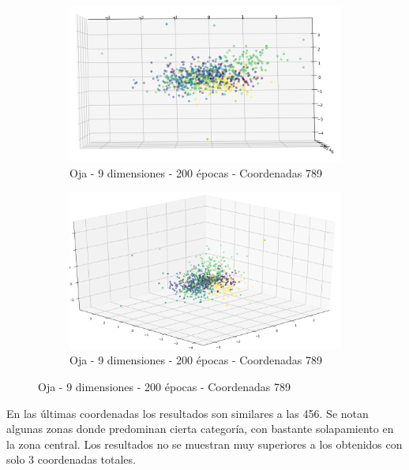 \begin{figure}[!htbp]
\centering
\begin{subfigure}{.5\textwidth}
  \centering
  \includegraphics[width=1\linewidth, scale=1]{../img/ej1/oja_corrida_200_9/oja_9salida_200ep_testing_dim789_3.png}
  \caption{Oja - 9 dimensiones - 200 épocas - Coordenadas 789}
  \label{fig:sub1}
\end{subfigure}%
\begin{subfigure}{.5\textwidth}
  \centering
  \includegraphics[width=1\linewidth, scale=1]{../img/ej1/oja_corrida_200_9/oja_9salida_200ep_testing_dim789_4.png}
  \caption{Oja - 9 dimensiones - 200 épocas - Coordenadas 789}
  \label{fig:sub2}
\end{subfigure}
\end{figure}

En las últimas coordenadas los resultados son similares a las 456. Se notan algunas zonas donde predominan cierta categoría, con bastante solapamiento en la zona central.
Los resultados no se muestran muy superiores a los obtenidos con solo 3 coordenadas totales.

